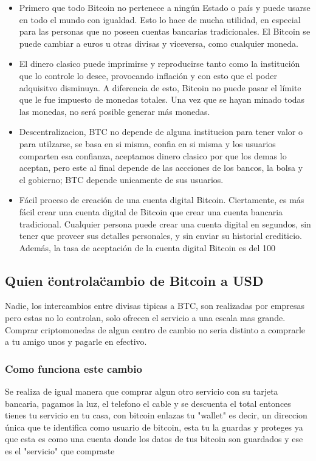 \documentclass[12pt,letterpaper]{article}
\begin{document}
    \begin{itemize}
	    \item Primero que todo Bitcoin no pertenece a ning\'un Estado o pa\'is y puede usarse en todo el mundo con igualdad. Esto lo hace de mucha utilidad, en especial para las personas que no poseen cuentas bancarias tradicionales. El Bitcoin se puede cambiar a euros u otras divisas y viceversa, como cualquier moneda. 
	
        \item El dinero clasico puede imprimirse y reproducirse tanto como la instituci\'on que lo controle lo desee, provocando inflaci\'on y con esto que el poder adquisitvo disminuya. A diferencia de esto, Bitcoin no puede pasar el l\'imite que le fue impuesto de monedas totales. Una vez que se hayan minado todas las monedas, no ser\'a posible generar m\'as monedas.
	
	    \item Descentralizacion, BTC no depende de alguna institucion para tener valor o para utilzarse, se basa en si misma, confia en si misma y los usuarios comparten esa confianza, aceptamos dinero clasico por que los demas lo aceptan, pero este al final depende de las accciones de los bancos, la bolsa y el gobierno; BTC depende unicamente de sus usuarios.
	
	    \item F\'acil proceso de creaci\'on de una cuenta digital Bitcoin. Ciertamente, es m\'as f\'acil crear una cuenta digital de Bitcoin que crear una cuenta bancaria tradicional. Cualquier persona puede crear una cuenta digital en segundos, sin tener que proveer sus detalles personales, y sin enviar su historial crediticio. Adem\'as, la tasa de aceptaci\'on de la cuenta digital Bitcoin es del 100%
    
    \end{itemize}
	
	\subsection*{Quien \"controla\" cambio de Bitcoin a USD}
	Nadie, los intercambios entre divisas tipicas a BTC, son realizadas por empresas pero estas no lo controlan, solo ofrecen el servicio a una escala mas grande. Comprar criptomonedas de algun centro de cambio no seria distinto a comprarle a tu amigo unos y pagarle en efectivo.

		\subsubsection*{Como funciona este cambio}
        Se realiza de igual manera que comprar algun otro servicio con su tarjeta bancaria, pagamos la luz, el telefono el cable y se descuenta el total entonces tienes tu servicio en tu casa, con bitcoin enlazas tu "wallet" es decir, un direccion \'unica que te identifica como usuario de bitcoin, esta tu la guardas y proteges ya que esta es como una cuenta donde los datos de tus bitcoin son guardados y ese es el "servicio" que compraste
\end{document}
